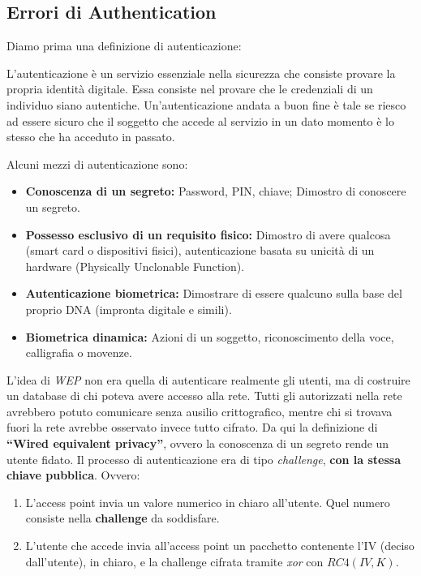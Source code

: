 \subsection{Errori di Authentication}
Diamo prima una definizione di autenticazione:
\begin{definition}[Authentication]
L'autenticazione è un servizio essenziale nella sicurezza che consiste provare la propria identità digitale. Essa consiste nel provare che le credenziali di un individuo siano autentiche. Un'autenticazione andata a buon fine è tale se riesco ad essere sicuro che il soggetto che accede al servizio in un dato momento è lo stesso che ha acceduto in passato.
\end{definition}
\begin{proposition}
Alcuni mezzi di autenticazione sono:
\begin{itemize}
    \item \textbf{Conoscenza di un segreto:} Password, PIN, chiave; Dimostro di conoscere un segreto.
    \item \textbf{Possesso esclusivo di un requisito fisico:} Dimostro di avere qualcosa (smart card o dispositivi fisici), autenticazione basata su unicità di un hardware (Physically Unclonable Function).
    \item \textbf{Autenticazione biometrica:} Dimostrare di essere qualcuno sulla base del proprio DNA (impronta digitale e simili).
    \item \textbf{Biometrica dinamica:} Azioni di un soggetto, riconoscimento della voce, calligrafia o movenze.
\end{itemize}
\end{proposition}
L'idea di \textit{WEP} non era quella di autenticare realmente gli utenti, ma di costruire un database di chi poteva avere accesso alla rete. Tutti gli autorizzati nella rete avrebbero potuto comunicare senza ausilio crittografico, mentre chi si trovava fuori la rete avrebbe osservato invece tutto cifrato. Da qui la definizione di \textbf{“Wired equivalent privacy”}, ovvero la conoscenza di un segreto rende un utente fidato.\newpage
Il processo di autenticazione era di tipo \textit{challenge}, \textbf{con la stessa chiave pubblica}. Ovvero:
\begin{enumerate}
    \item L'access point invia un valore numerico in chiaro all'utente. Quel numero consiste nella \textbf{challenge} da soddisfare.
    \item L'utente che accede invia all'access point un pacchetto contenente l'IV (deciso dall'utente), in chiaro, e la challenge cifrata tramite \textit{xor} con $RC4(IV,K)$.
\end{enumerate}
